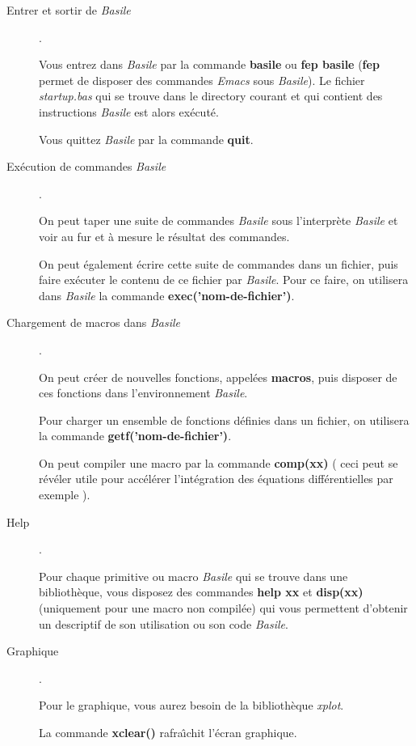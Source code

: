 \begin{description}

\item[Entrer et sortir de {\em Basile}] .

Vous entrez dans {\em Basile} par la commande {\bf basile} ou {\bf fep basile}
 ({\bf fep} permet de disposer des commandes {\em Emacs} sous {\em Basile}).
 Le  fichier {\em startup.bas} qui se trouve dans le directory courant 
et qui contient des instructions {\em Basile} est alors ex\'ecut\'e.

Vous quittez {\em Basile} par la commande {\bf quit}.

\item[Ex\'ecution de commandes {\em Basile}] .

On peut taper une suite de commandes {\em Basile} sous l'inter\-pr\`e\-te 
 {\em Basile} et voir au fur et \`a mesure le r\'esultat des commandes.

On peut \'egalement \'ecrire cette suite de commandes dans un fichier,
 puis faire  ex\'ecuter  le contenu de ce  fichier par {\em Basile}. 
 Pour ce faire, on utilisera dans {\em Basile}  la commande
  {\bf exec('nom-de-fichier')}. 


\item[Chargement de macros dans {\em Basile}] .

On peut cr\'eer de nouvelles fonctions, 
 appel\'ees {\bf macros}, puis
 disposer de ces fonctions dans l'environnement {\em Basile}.
 
Pour charger  un ensemble de fonctions d\'efinies dans un fichier,
 on utilisera la commande {\bf getf('nom-de-fichier')}.

On peut compiler une macro par la 
 commande {\bf comp{(xx)}} ( ceci peut se r\'ev\'eler utile pour 
 acc\'el\'erer  l'int\'egration des \'equations diff\'erentielles
par exemple ).

\item[Help] .

Pour chaque primitive ou macro {\em Basile} qui se trouve dans une 
biblioth\`eque, vous disposez des commandes 
{\bf help xx} et {\bf disp(xx)} (uniquement pour une macro non compil\'ee)
  qui vous permettent d'obtenir un descriptif de son utilisation  
  ou son code {\em Basile}.

\item[Graphique] .

Pour le graphique, vous aurez besoin de la biblioth\`eque {\em xplot}.

La commande {\bf xclear()} rafra\^{\i}chit l'\'ecran graphique.

\end{description}

